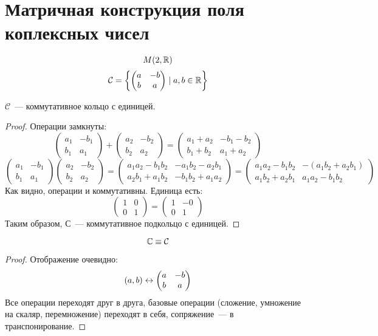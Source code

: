 \section{Матричная конструкция поля коплексных чисел}

$$M(2, \mathbb{R})$$
$$\mathcal{C} = \left\{\left(\begin{matrix}a & -b \\ b & a\end{matrix}\right) \mid a, b \in \mathbb{R}\right\}$$

\begin{assertion}
$\mathcal{C}$~--- коммутативное кольцо с единицей.
\end{assertion}
\begin{proof}
Операции замкнуты:
$$\left(\begin{matrix}a_1 & -b_1 \\ b_1 & a_1\end{matrix}\right) + \left(\begin{matrix}a_2 & -b_2 \\ b_2 & a_2\end{matrix}\right) = \left(\begin{matrix}a_1+a_2 & -b_1-b_2 \\ b_1+b_2 & a_1+a_2\end{matrix}\right)$$
$$\left(\begin{matrix}a_1 & -b_1 \\ b_1 & a_1\end{matrix}\right) \left(\begin{matrix}a_2 & -b_2 \\ b_2 & a_2\end{matrix}\right) = \left(\begin{matrix}a_1a_2-b_1b_2 & -a_1b_2-a_2b_1 \\ a_2b_1+a_1b_2 & -b_1b_2+a_1a_2\end{matrix}\right) = \left(\begin{matrix}a_1a_2-b_1b_2 & -(a_1b_2+a_2b_1) \\ a_1b_2+a_2b_1 & a_1a_2-b_1b_2\end{matrix}\right)$$
Как видно, операции и коммутативны.
Единица есть:
$$\left(\begin{matrix}1 & 0 \\ 0 & 1\end{matrix}\right) = \left(\begin{matrix}1 & -0 \\ 0 & 1\end{matrix}\right)$$
Таким образом, $\mathcal{С}$~--- коммутативное подкольцо с единицей.
\end{proof}

\begin{assertion}
$$\mathbb{C} \equiv \mathcal{C}$$
\end{assertion}
\begin{proof}
Отображение очевидно:
$$(a, b) \leftrightarrow \left(\begin{matrix}a & -b \\ b & a\end{matrix}\right)$$
Все операции переходят друг в друга, базовые операции (сложение, умножение на скаляр, перемножение) переходят в себя, сопряжение~--- в транспонирование.
\end{proof}
